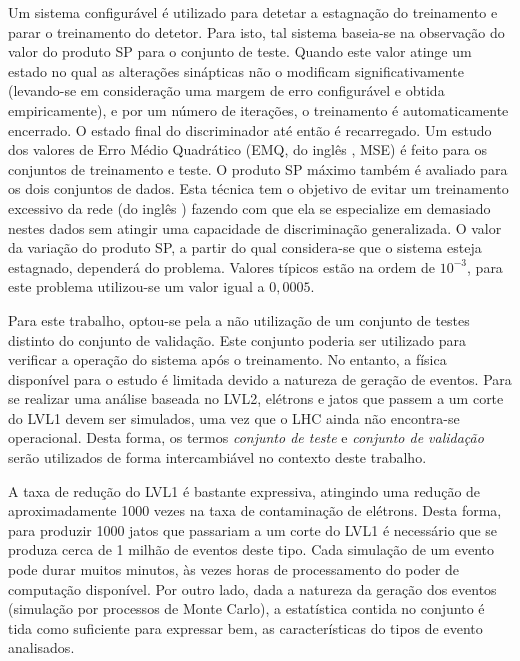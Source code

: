 Um sistema configurável é utilizado para detetar a estagnação do treinamento e
parar o treinamento do detetor. Para isto, tal sistema baseia-se na observação
do valor do produto SP para o conjunto de teste. Quando este valor atinge um
estado no qual as alterações sinápticas não o modificam significativamente
(levando-se em consideração uma margem de erro configurável e obtida
empiricamente), e por um número de iterações, o treinamento é automaticamente
encerrado. O estado final do discriminador até então é recarregado. Um estudo
dos valores de Erro Médio Quadrático (EMQ, do inglês ,
MSE) é feito para os conjuntos de treinamento e teste. O produto SP máximo
também é avaliado para os dois conjuntos de dados. Esta técnica tem o objetivo
de evitar um treinamento excessivo da rede (do inglês )
fazendo com que ela se especialize em demasiado nestes dados sem atingir uma
capacidade de discriminação generalizada. O valor da variação do produto SP, a
partir do qual considera-se que o sistema esteja estagnado, dependerá do
problema. Valores típicos estão na ordem de $10^{-3}$, para este problema
utilizou-se um valor igual a $0,0005$.

Para este trabalho, optou-se pela a não utilização de um conjunto de testes
distinto do conjunto de validação. Este conjunto poderia ser utilizado para
verificar a operação do sistema após o treinamento. No entanto, a física
disponível para o estudo é limitada devido a natureza de geração de
eventos. Para se realizar uma análise baseada no LVL2, elétrons e jatos que
passem a um corte do LVL1 devem ser simulados, uma vez que o LHC ainda não
encontra-se operacional. Desta forma, os termos \textit{conjunto de teste} e
\textit{conjunto de validação} serão utilizados de forma intercambiável no
contexto deste trabalho.

A taxa de redução do LVL1 é bastante expressiva, atingindo uma redução de
aproximadamente 1000 vezes na taxa de contaminação de elétrons. Desta forma,
para produzir 1000 jatos que passariam a um corte do LVL1 é necessário que se
produza cerca de 1 milhão de eventos deste tipo. Cada simulação de um evento
pode durar muitos minutos, às vezes horas de processamento do poder de
computação disponível. Por outro lado, dada a natureza da geração dos eventos
(simulação por processos de Monte Carlo), a estatística contida no conjunto é
tida como suficiente para expressar bem, as características do tipos de evento
analisados.


